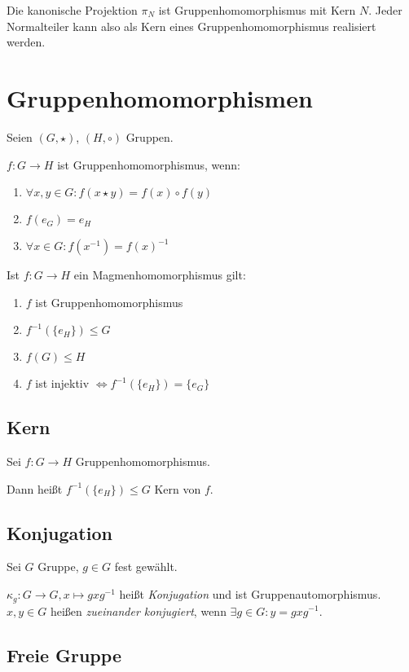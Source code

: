 Die kanonische Projektion $\pi_N$ ist Gruppenhomomorphismus mit Kern $N$. Jeder Normalteiler kann also als Kern eines Gruppenhomomorphismus realisiert werden.

\section*{Gruppenhomomorphismen}

Seien $(G,\star)$, $(H,\circ)$ Gruppen.

$f : G \rightarrow H$ ist Gruppenhomomorphismus, wenn:

\begin{enumerate}[label=(\alph*)]
	\item $\forall x, y \in G : f(x \star y) = f(x) \circ f(y)$
	\item $f(e_G) = e_H$
	\item $\forall x \in G : f(x^{-1}) = f(x)^{-1}$
\end{enumerate}

Ist $f : G \rightarrow H$ ein Magmenhomomorphismus gilt:

\begin{enumerate}[label=(\alph*)]
	\item $f$ ist Gruppenhomomorphismus
	\item $f^{-1}(\{e_H\}) \leq G$
	\item $f(G) \leq H$
	\item $f$ ist injektiv $\iff f^{-1}(\{e_H\}) = \{e_G\}$
\end{enumerate}

\subsection*{Kern}

Sei $f : G \rightarrow H$ Gruppenhomomorphismus.

Dann heißt $f^{-1}(\{e_H\}) \leq G$ Kern von $f$.

\subsection*{Konjugation}

Sei $G$ Gruppe, $g \in G$ fest gewählt.

$\kappa_g : G \rightarrow G, x \mapsto gxg^{-1}$ heißt \emph{Konjugation} und ist Gruppenautomorphismus. $x, y \in G$ heißen \emph{zueinander konjugiert}, wenn $\exists g \in G : y = gxg^{-1}$.

\subsection*{Freie Gruppe}

